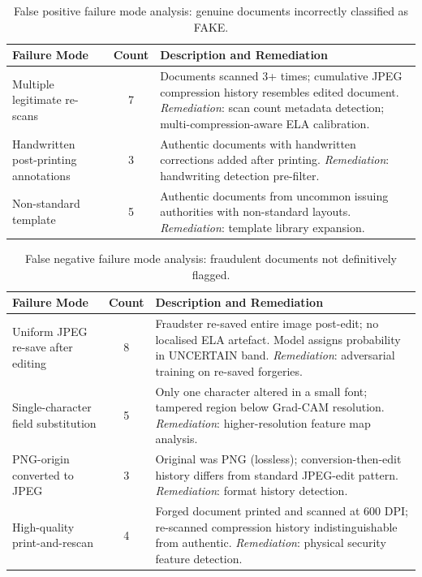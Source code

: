 \documentclass[12pt,a4paper,oneside]{report}
\begin{document}
\begin{table}[H]
\centering
\caption{False positive failure mode analysis: genuine documents incorrectly classified as FAKE.}
\label{tab:fp_analysis}
\renewcommand{\arraystretch}{1.3}
\begin{tabular}{p{3.5cm}cp{7.5cm}}
\toprule
\textbf{Failure Mode} & \textbf{Count} & \textbf{Description and Remediation} \\
\midrule
Multiple legitimate re-scans & 7 & Documents scanned 3+ times; cumulative JPEG compression history resembles edited document. \textit{Remediation}: scan count metadata detection; multi-compression-aware ELA calibration. \\
Handwritten post-printing annotations & 3 & Authentic documents with handwritten corrections added after printing. \textit{Remediation}: handwriting detection pre-filter. \\
Non-standard template & 5 & Authentic documents from uncommon issuing authorities with non-standard layouts. \textit{Remediation}: template library expansion. \\
\bottomrule
\end{tabular}
\end{table}

\begin{table}[H]
\centering
\caption{False negative failure mode analysis: fraudulent documents not definitively flagged.}
\label{tab:fn_analysis}
\renewcommand{\arraystretch}{1.3}
\begin{tabular}{p{3.5cm}cp{7.5cm}}
\toprule
\textbf{Failure Mode} & \textbf{Count} & \textbf{Description and Remediation} \\
\midrule
Uniform JPEG re-save after editing & 8 & Fraudster re-saved entire image post-edit; no localised ELA artefact. Model assigns probability in UNCERTAIN band. \textit{Remediation}: adversarial training on re-saved forgeries. \\
Single-character field substitution & 5 & Only one character altered in a small font; tampered region below Grad-CAM resolution. \textit{Remediation}: higher-resolution feature map analysis. \\
PNG-origin converted to JPEG & 3 & Original was PNG (lossless); conversion-then-edit history differs from standard JPEG-edit pattern. \textit{Remediation}: format history detection. \\
High-quality print-and-rescan & 4 & Forged document printed and scanned at 600 DPI; re-scanned compression history indistinguishable from authentic. \textit{Remediation}: physical security feature detection. \\
\bottomrule
\end{tabular}
\end{table}
\end{document}
